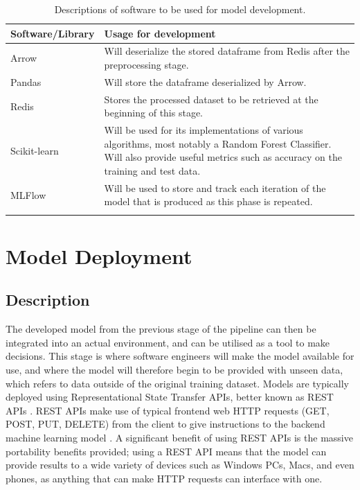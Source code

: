 \documentclass[12pt]{report}
\begin{document}
\begin{longtable}{ |p{}| p{}|}
    \hline
    \cellcolor{blue!25}Software/Library & \cellcolor{blue!25}Usage for development\\
    \hline
    Arrow & 
    Will deserialize the stored dataframe from Redis after the preprocessing stage.\\
    \hline
    Pandas & 
    Will store the dataframe deserialized by Arrow.\\
    \hline
    Redis &
    Stores the processed dataset to be retrieved at the beginning of this stage.\\
    \hline
    Scikit-learn & 
    Will be used for its implementations of various algorithms, most notably a Random Forest Classifier.
    Will also provide useful metrics such as accuracy on the training and test data.\\
    \hline
    MLFlow &
    Will be used to store and track each iteration of the model that is produced as this phase is 
    repeated.\\
    \hline
\caption{Descriptions of software to be used for model development.}\label{tab:DevelopmentSoftware}
\end{longtable}



\section{Model Deployment}\label{sec:Deployment}
\subsection{Description}
The developed model from the previous stage of the pipeline can then be integrated into an actual environment,
and can be utilised as a tool to make decisions. This stage is where software engineers will make the model 
available for use, and where the model will therefore begin to be provided with unseen data, which refers to data 
outside of the original training dataset. Models are typically deployed using Representational State Transfer APIs, 
better known as REST APIs \autocite{redhat_what_nodate}. REST APIs make use of typical frontend web 
HTTP requests (GET, POST, PUT, DELETE) from the client to give instructions to the backend machine learning
model \autocite{restfulapi_what_2023}. A significant benefit of using REST APIs is the 
massive portability benefits provided; using a REST API means that the model can provide results to a 
wide variety of devices such as Windows PCs, Macs, and even phones, as anything that can make HTTP requests 
can interface with one.
\end{document}

